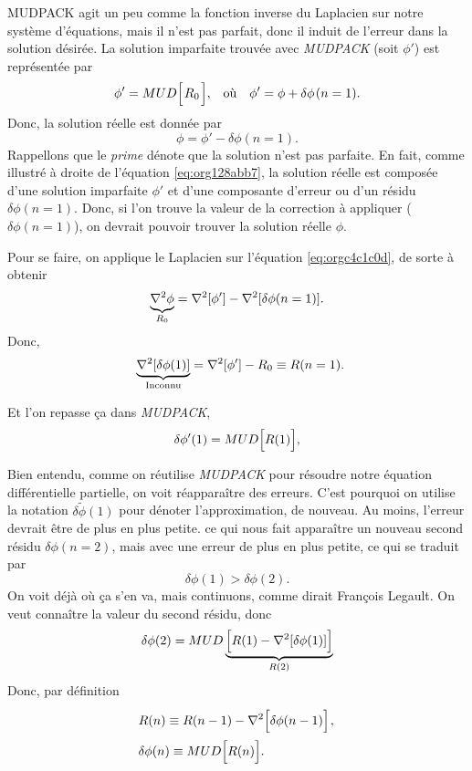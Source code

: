 \documentclass[10pt]{report}
\numberwithin{equation}{section}
\newcommand{\tall}{\vphantom{A^{x^x}_p}}
\newcommand{\grande}{\vphantom{\frac{1}{xx}}}
\newcommand{\pt}{\hspace{1pt}} %
\newcommand{\tphi}{\tilde{\phi}}
\begin{document}
MUDPACK agit un peu comme la fonction inverse du Laplacien sur notre système d'équations, mais il n'est pas parfait, donc il induit de l'erreur dans la solution désirée.
La solution imparfaite trouvée avec \emph{MUDPACK} (soit \(\phi'\)) est représentée par 
\begin{align}
\label{eq:org128abb7}
   && \phi' = MUD\qty[\pt R_0\pt\tall ], && \text{où} && \phi' = \phi + \delta\phi\pt(n=1).&&
\end{align}
Donc, la solution réelle est donnée par
\begin{equation}
\label{eq:orgc4c1c0d}
   \phi = \phi' - \delta\phi(n=1).
\end{equation}
Rappellons que le \emph{prime} dénote que la solution n'est pas parfaite. En fait, comme illustré à droite de l'équation \ref{eq:org128abb7}, la solution réelle est composée d'une solution imparfaite \(\phi'\) et d'une composante d'erreur ou d'un résidu \(\delta \phi(n=1)\).
Donc, si l'on trouve la valeur de la correction à appliquer (\(\delta\phi(n=1)\)), on devrait pouvoir trouver la solution réelle \(\phi\).\bigskip

Pour se faire, on applique le Laplacien sur l'équation \ref{eq:orgc4c1c0d}, de sorte à obtenir
\begin{equation}
   \underbrace{\laplacian{\phi}}_{R_0} = \laplacian[\phi'] - \laplacian[\delta\phi(n=1)].
\end{equation}
Donc,
\begin{equation}
   \hspace{2mm} \underbrace{\laplacian[\delta\phi(1)]}_\text{Inconnu} = \laplacian[\phi'] - R_0 \equiv R(n=1).
\end{equation}

Et l'on repasse ça dans \emph{MUDPACK},
\begin{equation}
   \delta\phi'(1) = MUD\qty[\tall R(1) ],
\end{equation}


Bien entendu, comme on réutilise \emph{MUDPACK} pour résoudre notre équation différentielle partielle, on voit réapparaître des erreurs.
C'est pourquoi on utilise la notation \(\delta \tphi(1)\) pour dénoter l'approximation, de nouveau.
Au moins, l'erreur devrait être de plus en plus petite.
ce qui nous fait apparaître un nouveau second résidu \(\delta\phi(n=2)\), mais avec une erreur de plus en plus petite, ce qui se traduit par
\begin{equation}
   \delta\phi(1) > \delta\phi(2).
\end{equation}
On voit déjà où ça s'en va, mais continuons, comme dirait François Legault.
On veut connaître la valeur du second résidu, donc
\begin{equation}
   \delta \phi(2) = MUD\underbrace{\qty[R(1)\tall - \laplacian[\delta\phi(1)]]}_{R(2)}
\end{equation}
Donc, par définition
\begin{align}
   & R(n) \equiv R(n-1) - \laplacian[\delta\phi(n-1)\tall]\pt,\grande\\
   & \delta\phi(n) \equiv MUD\qty[R(n)\tall].\grande
\end{align}
\end{document}
